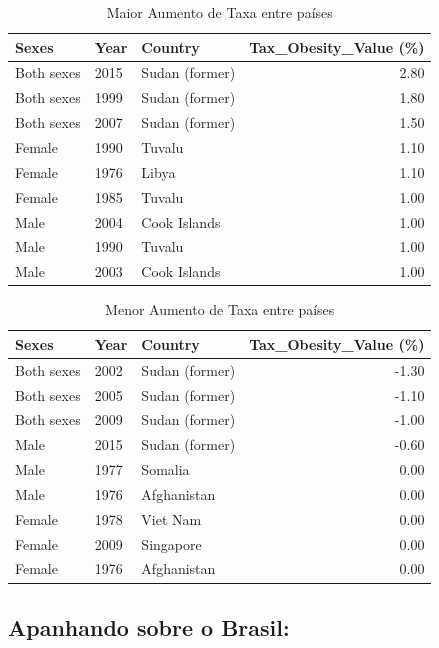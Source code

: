 \documentclass{article}%
\begin{document}
\begin{table}[htbp]%
\centering%
\begin{tabular}{lllr}
\toprule
Sexes & Year & Country & Tax\_Obesity\_Value (\%) \\
\midrule
Both sexes & 2015 & Sudan (former) & 2.80 \\
Both sexes & 1999 & Sudan (former) & 1.80 \\
Both sexes & 2007 & Sudan (former) & 1.50 \\
Female & 1990 & Tuvalu & 1.10 \\
Female & 1976 & Libya & 1.10 \\
Female & 1985 & Tuvalu & 1.00 \\
Male & 2004 & Cook Islands & 1.00 \\
Male & 1990 & Tuvalu & 1.00 \\
Male & 2003 & Cook Islands & 1.00 \\
\bottomrule
\end{tabular}
%
\caption{Maior Aumento de Taxa entre países}%
\end{table}

%


\begin{table}[htbp]%
\centering%
\begin{tabular}{lllr}
\toprule
Sexes & Year & Country & Tax\_Obesity\_Value (\%) \\
\midrule
Both sexes & 2002 & Sudan (former) & -1.30 \\
Both sexes & 2005 & Sudan (former) & -1.10 \\
Both sexes & 2009 & Sudan (former) & -1.00 \\
Male & 2015 & Sudan (former) & -0.60 \\
Male & 1977 & Somalia & 0.00 \\
Male & 1976 & Afghanistan & 0.00 \\
Female & 1978 & Viet Nam & 0.00 \\
Female & 2009 & Singapore & 0.00 \\
Female & 1976 & Afghanistan & 0.00 \\
\bottomrule
\end{tabular}
%
\caption{Menor Aumento de Taxa entre países}%
\end{table}

%
\newpage%
\subsection{Apanhando sobre o Brasil:}%
\label{subsec:ApanhandosobreoBrasil}%
\end{document}
